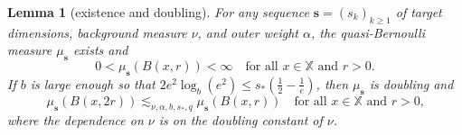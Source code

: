 \documentclass[12pt]{amsart}
\newtheorem{lemma}[theorem]{Lemma}
\theoremstyle{definition}
\theoremstyle{remark}
\newcommand{\XX}{\mathbb{X}}
\newcommand{\muse}{\mu_{\mathbf{s}}}
\numberwithin{figure}{section}
\numberwithin{equation}{section}
\begin{document}
\begin{lemma}[existence and doubling] \label{qb-doubling} For any sequence $\mathbf{s}=(s_k)_{k\geq 1}$ of target dimensions, background measure $\nu$, and outer weight $\alpha$, the quasi-Bernoulli measure $\muse$ exists and \begin{equation}\label{support} 0<\muse(B(x,r))<\infty\quad\text{for all $x\in\XX$ and $r>0$}.\end{equation} If $b$ is large enough so that $2e^2\log_b(e^2)\leq s_*(\tfrac12-\tfrac{1}{e})$,  then $\muse$ is doubling and \begin{equation} \label{b-doubling} \muse(B(x,2r))\lesssim_{\nu,\alpha,b,s_*,q}\muse(B(x,r))\quad\text{for all $x\in\XX$ and $r>0$,}\end{equation} where the dependence on $\nu$ is on the doubling constant of $\nu$.\end{lemma}
\end{document}
